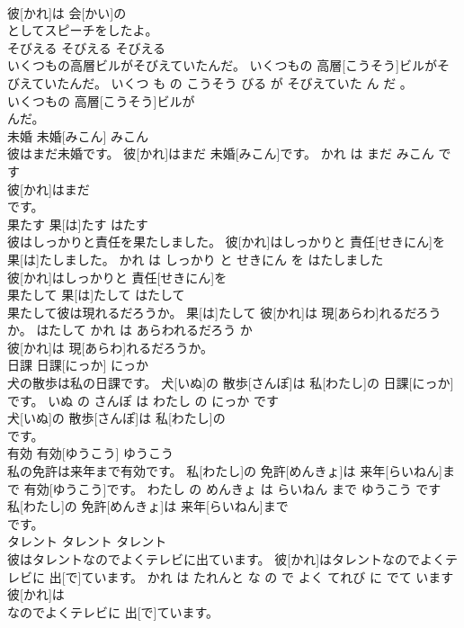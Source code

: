 \documentclass[8pt]{extreport}
\begin{document}
\begin{CJK}{UTF8}{min}
\\	彼[かれ]は 会[かい]の
\\	としてスピーチをしたよ。			
\\	そびえる	そびえる	そびえる	
\\	いくつもの高層ビルがそびえていたんだ。	いくつもの 高層[こうそう]ビルがそびえていたんだ。	いくつ も の こうそう びる が そびえていた ん だ 。	
\\	いくつもの 高層[こうそう]ビルが
\\	んだ。			
\\	未婚	未婚[みこん]	みこん	
\\	彼はまだ未婚です。	彼[かれ]はまだ 未婚[みこん]です。	かれ は まだ みこん です	
\\	彼[かれ]はまだ
\\	です。			
\\	果たす	果[は]たす	はたす	
\\	彼はしっかりと責任を果たしました。	彼[かれ]はしっかりと 責任[せきにん]を 果[は]たしました。	かれ は しっかり と せきにん を はたしました	
\\	彼[かれ]はしっかりと 責任[せきにん]を
\\	果たして	果[は]たして	はたして	
\\	果たして彼は現れるだろうか。	果[は]たして 彼[かれ]は 現[あらわ]れるだろうか。	はたして かれ は あらわれるだろう か	
\\	彼[かれ]は 現[あらわ]れるだろうか。			
\\	日課	日課[にっか]	にっか	
\\	犬の散歩は私の日課です。	犬[いぬ]の 散歩[さんぽ]は 私[わたし]の 日課[にっか]です。	いぬ の さんぽ は わたし の にっか です	
\\	犬[いぬ]の 散歩[さんぽ]は 私[わたし]の
\\	です。			
\\	有効	有効[ゆうこう]	ゆうこう	
\\	私の免許は来年まで有効です。	私[わたし]の 免許[めんきょ]は 来年[らいねん]まで 有効[ゆうこう]です。	わたし の めんきょ は らいねん まで ゆうこう です	
\\	私[わたし]の 免許[めんきょ]は 来年[らいねん]まで
\\	です。			
\\	タレント	タレント	タレント	
\\	彼はタレントなのでよくテレビに出ています。	彼[かれ]はタレントなのでよくテレビに 出[で]ています。	かれ は たれんと な の で よく てれび に でて います	
\\	彼[かれ]は
\\	なのでよくテレビに 出[で]ています。			

\end{CJK}
\end{document}
